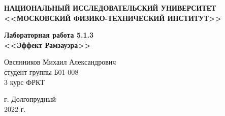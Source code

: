 \begin{center}
	
	\textbf{НАЦИОНАЛЬНЫЙ ИССЛЕДОВАТЕЛЬСКИЙ УНИВЕРСИТЕТ \\ <<МОСКОВСКИЙ ФИЗИКО-ТЕХНИЧЕСКИЙ ИНСТИТУТ>>}
	\vspace{13ex}
	
	\textbf{Лабораторная работа 5.1.3\\ <<Эффект Рамзауэра>>}
	\vspace{40ex}
	
	\normalsize{Овсянников Михаил Александрович \\ студент группы Б01-008\\ 3 курс ФРКТ\\}

\end{center}

\vfill 

\begin{center}
	г. Долгопрудный\\ 
	2022 г.
\end{center}


\thispagestyle{empty}